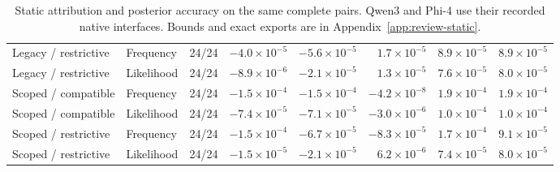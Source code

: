 \begin{table}[t]
{\begin{tabular*}{\textwidth}{@{\extracolsep{\fill}}llrrrrrr@{}}
Legacy / restrictive & Frequency & 24/24 & $-4.0\times10^{-5}$ & $-5.6\times10^{-5}$ & $1.7\times10^{-5}$ & $8.9\times10^{-5}$ & $8.9\times10^{-5}$ \\
Legacy / restrictive & Likelihood & 24/24 & $-8.9\times10^{-6}$ & $-2.1\times10^{-5}$ & $1.3\times10^{-5}$ & $7.6\times10^{-5}$ & $8.0\times10^{-5}$ \\
Scoped / compatible & Frequency & 24/24 & $-1.5\times10^{-4}$ & $-1.5\times10^{-4}$ & $-4.2\times10^{-8}$ & $1.9\times10^{-4}$ & $1.9\times10^{-4}$ \\
Scoped / compatible & Likelihood & 24/24 & $-7.4\times10^{-5}$ & $-7.1\times10^{-5}$ & $-3.0\times10^{-6}$ & $1.0\times10^{-4}$ & $1.0\times10^{-4}$ \\
Scoped / restrictive & Frequency & 24/24 & $-1.5\times10^{-4}$ & $-6.7\times10^{-5}$ & $-8.3\times10^{-5}$ & $1.7\times10^{-4}$ & $9.1\times10^{-5}$ \\
Scoped / restrictive & Likelihood & 24/24 & $-1.5\times10^{-5}$ & $-2.1\times10^{-5}$ & $6.2\times10^{-6}$ & $7.4\times10^{-5}$ & $8.0\times10^{-5}$ \\
\bottomrule
\end{tabular*}
}
\caption{Static attribution and posterior accuracy on the same complete pairs. Qwen3 and Phi-4 use their recorded native interfaces. Bounds and exact exports are in Appendix~\ref{app:review-static}.}
\label{tab:main-results}
\end{table}
